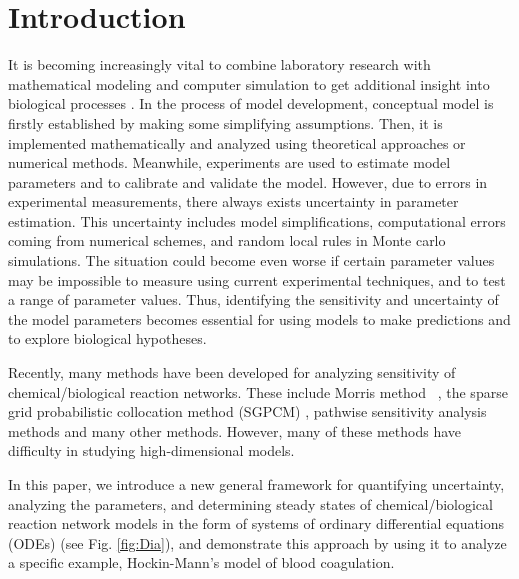 \def\CTeXPreproc{Created by ctex v0.2.11, don't edit!}
\section*{Introduction}
\label{sec:intro}


 It is becoming increasingly vital to combine
laboratory research with mathematical modeling and computer
simulation to get additional insight into biological processes
\cite{AssHer06,Arn06,CNX,HRAMMA,LGWNC,
LZV,MCNJY,PWSNCM,SJKA1,SJKA2,SCBM,TPMA,WJKA}. %
In the process of model development, conceptual model is firstly
established by making some simplifying
assumptions. Then, it is implemented mathematically and analyzed using
theoretical approaches or numerical methods. Meanwhile,
experiments are used to estimate model parameters
and to calibrate
 and validate the model. However, due to errors in experimental
measurements, there always exists uncertainty in parameter
estimation. This uncertainty includes model simplifications,
computational errors coming from numerical schemes, and random local
rules in Monte carlo simulations. The situation could become even
worse if certain parameter values may be impossible to measure using
current experimental techniques, and to test a range of parameter
values. %
Thus, identifying the sensitivity and uncertainty
of the model parameters becomes essential for using models to make
predictions and to explore biological hypotheses.


Recently, many methods have been developed for analyzing sensitivity of chemical/biological reaction networks. These include Morris method ~\cite{Morris91}, the sparse grid
probabilistic collocation method (SGPCM) \cite{DBJSH, LinAMTAWR,
LinAMTJSC}, pathwise sensitivity analysis methods \cite{PKV13} and many other methods.
However, many of these methods have difficulty in studying high-dimensional models.

In this paper, we introduce a new general framework for quantifying
uncertainty, analyzing the parameters, and determining steady states
of chemical/biological reaction network models in the form of systems of ordinary differential equations (ODEs) (see Fig. \ref{fig:Dia}),
and demonstrate this
approach by using it to analyze a specific example, Hockin-Mann's model \cite{HocJon02} of blood coagulation. 

